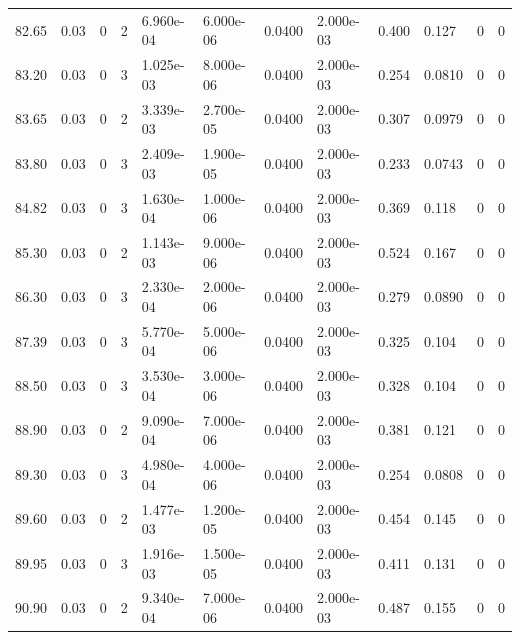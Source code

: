 \documentclass[preview]{standalone}
\begin{document}
{{{\begin{tabular}{L{1.2cm}C{1.2cm} C{0.3cm}C{0.5cm} C{1.4cm}C{1.4cm} C{1.4cm}C{1.4cm} C{1.6cm}C{1.6cm} C{1.6cm}C{1.6cm}}
  82.65  &  0.03  & 0     &  2 &  6.960e-04  & 6.000e-06  &  0.0400&   2.000e-03& 0.400 & 0.127   &  0 & 0  \\ 
  83.20  &  0.03  & 0     &  3 &  1.025e-03  & 8.000e-06  &  0.0400&   2.000e-03& 0.254 & 0.0810   &  0 & 0  \\ 
  83.65  &  0.03  & 0     &  2 &  3.339e-03  & 2.700e-05  &  0.0400&   2.000e-03& 0.307 & 0.0979   &  0 & 0  \\ 
  83.80  &  0.03  & 0     &  3 &  2.409e-03  & 1.900e-05  &  0.0400&   2.000e-03& 0.233 & 0.0743   &  0 & 0  \\ 
  84.82  &  0.03  & 0     &  3 &  1.630e-04  & 1.000e-06  &  0.0400&   2.000e-03& 0.369 & 0.118   &  0 & 0  \\ 
  85.30  &  0.03  & 0     &  2 &  1.143e-03  & 9.000e-06  &  0.0400&   2.000e-03& 0.524 & 0.167   &  0 & 0  \\ 
  86.30  &  0.03  & 0     &  3 &  2.330e-04  & 2.000e-06  &  0.0400&   2.000e-03& 0.279 & 0.0890   &  0 & 0  \\ 
  87.39  &  0.03  & 0     &  3 &  5.770e-04  & 5.000e-06  &  0.0400&   2.000e-03& 0.325 & 0.104   &  0 & 0  \\ 
  88.50  &  0.03  & 0     &  3 &  3.530e-04  & 3.000e-06  &  0.0400&   2.000e-03& 0.328 & 0.104   &  0 & 0  \\ 
  88.90  &  0.03  & 0     &  2 &  9.090e-04  & 7.000e-06  &  0.0400&   2.000e-03& 0.381 & 0.121   &  0 & 0  \\ 
  89.30  &  0.03  & 0     &  3 &  4.980e-04  & 4.000e-06  &  0.0400&   2.000e-03& 0.254 & 0.0808   &  0 & 0  \\ 
  89.60  &  0.03  & 0     &  2 &  1.477e-03  & 1.200e-05  &  0.0400&   2.000e-03& 0.454 & 0.145   &  0 & 0  \\ 
  89.95  &  0.03  & 0     &  3 &  1.916e-03  & 1.500e-05  &  0.0400&   2.000e-03& 0.411 & 0.131   &  0 & 0  \\ 
  90.90  &  0.03  & 0     &  2 &  9.340e-04  & 7.000e-06  &  0.0400&   2.000e-03& 0.487 & 0.155   &  0 & 0  \\ 
\hline 
\end{tabular} 

}}}
\end{document}
